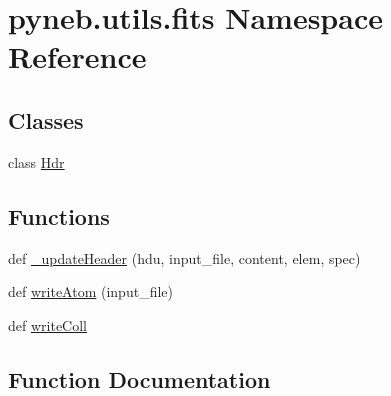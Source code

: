 \hypertarget{namespacepyneb_1_1utils_1_1fits}{}\section{pyneb.\+utils.\+fits Namespace Reference}
\label{namespacepyneb_1_1utils_1_1fits}
\subsection*{Classes}
\begin{DoxyCompactItemize}
\item 
class \hyperlink{classpyneb_1_1utils_1_1fits_1_1_hdr}{Hdr}
\end{DoxyCompactItemize}
\subsection*{Functions}
\begin{DoxyCompactItemize}
\item 
def \hyperlink{namespacepyneb_1_1utils_1_1fits_a2c9c6cf69be4278cdfb529f3a8f3dced}{\+\_\+update\+Header} (hdu, input\+\_\+file, content, elem, spec)
\item 
def \hyperlink{namespacepyneb_1_1utils_1_1fits_a6f08de2b93e2ebc207309560746e9235}{write\+Atom} (input\+\_\+file)
\item 
def \hyperlink{namespacepyneb_1_1utils_1_1fits_a468ecdfaa21de61a1037128ee889fd76}{write\+Coll}
\end{DoxyCompactItemize}


\subsection{Function Documentation}
\hypertarget{namespacepyneb_1_1utils_1_1fits_a2c9c6cf69be4278cdfb529f3a8f3dced}{}
